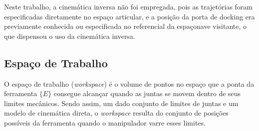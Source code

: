 
Neste trabalho, a cinemática inversa não foi empregada, pois as trajetórias foram especificadas diretamente no espaço articular,
e a posição da porta de docking era previamente conhecida ou especificada no referencial da espaçonave visitante, o que dispensou o uso da cinemática inversa. 
\subsection{Espaço de Trabalho}

O espaço de trabalho (\emph{workspace}) é o volume de pontos no espaço que a ponta da ferramenta $\{E\}$ consegue alcançar quando as juntas se movem dentro de seus limites mecânicos.
Sendo assim, um dado conjunto de limites de juntas e um modelo de cinemática direta, o \emph{workspace} resulta do conjunto de posições possíveis da ferramenta quando o manipulador varre esses limites.

